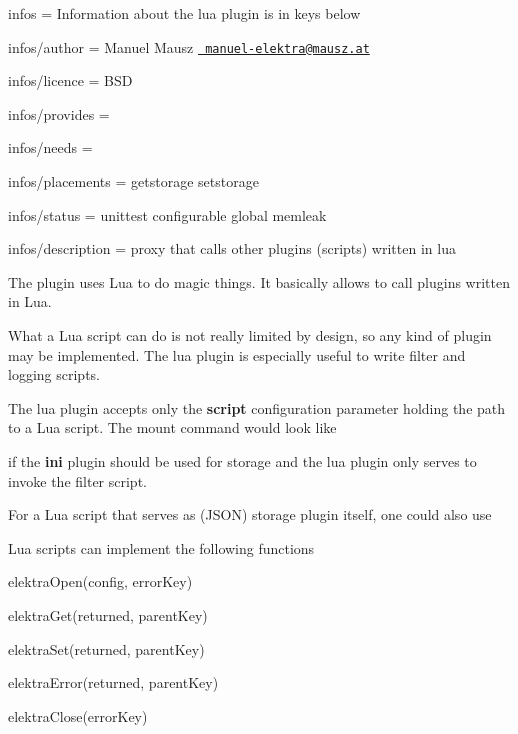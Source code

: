 
\begin{DoxyItemize}
\item infos = Information about the lua plugin is in keys below
\item infos/author = Manuel Mausz \href{mailto:manuel-elektra@mausz.at}{\texttt{ manuel-\/elektra@mausz.\+at}}
\item infos/licence = B\+SD
\item infos/provides =
\item infos/needs =
\item infos/placements = getstorage setstorage
\item infos/status = unittest configurable global memleak
\item infos/description = proxy that calls other plugins (scripts) written in lua
\end{DoxyItemize}

The plugin uses Lua to do magic things. It basically allows to call plugins written in Lua.

What a Lua script can do is not really limited by design, so any kind of plugin may be implemented. The lua plugin is especially useful to write filter and logging scripts.

The lua plugin accepts only the {\bfseries{script}} configuration parameter holding the path to a Lua script. The mount command would look like


\begin{DoxyCode}{0}
\end{DoxyCode}


if the {\bfseries{ini}} plugin should be used for storage and the lua plugin only serves to invoke the filter script.

For a Lua script that serves as (J\+S\+ON) storage plugin itself, one could also use


\begin{DoxyCode}{0}
\end{DoxyCode}


Lua scripts can implement the following functions


\begin{DoxyItemize}
\item elektra\+Open(config, error\+Key)
\item elektra\+Get(returned, parent\+Key)
\item elektra\+Set(returned, parent\+Key)
\item elektra\+Error(returned, parent\+Key)
\item elektra\+Close(error\+Key)
\end{DoxyItemize}


